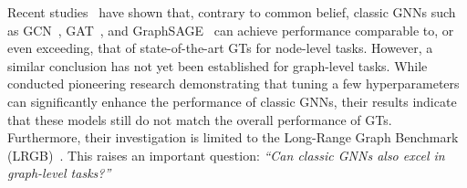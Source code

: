 





Recent studies~\cite{luo2024classic,luo2025node,luo2025beyond} have shown that, contrary to common belief, classic GNNs such as GCN~\cite{kipf2017semisupervised}, GAT~\cite{velivckovic2018graph}, and GraphSAGE~\cite{hamilton2017inductive} can achieve performance comparable to, or even exceeding, that of state-of-the-art GTs for node-level tasks. However, a similar conclusion has not yet been established for graph-level tasks. While \citet{tonshoff2023did} conducted pioneering research demonstrating that tuning a few hyperparameters can significantly enhance the performance of classic GNNs, their results indicate that these models still do not match the overall performance of GTs. Furthermore, their investigation is limited to the Long-Range Graph Benchmark (LRGB)~\cite{dwivedi2022long}. This raises an important question: \emph{``Can classic GNNs also excel in graph-level tasks?''}

